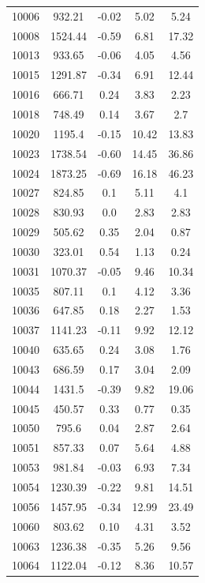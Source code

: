 {\begin{longtable}{ccccc}
10006 & 932.21 & -0.02 & 5.02 & 5.24 \\
10008 & 1524.44 & -0.59 & 6.81 & 17.32 \\
10013 & 933.65 & -0.06 & 4.05 & 4.56 \\
10015 & 1291.87 & -0.34 & 6.91 & 12.44 \\
10016 & 666.71 & 0.24 & 3.83 & 2.23 \\
10018 & 748.49 & 0.14 & 3.67 & 2.7 \\
10020 & 1195.4 & -0.15 & 10.42 & 13.83 \\
10023 & 1738.54 & -0.60 & 14.45 & 36.86 \\
10024 & 1873.25 & -0.69 & 16.18 & 46.23 \\
10027 & 824.85 & 0.1 & 5.11 & 4.1 \\
10028 & 830.93 & 0.0 & 2.83 & 2.83 \\
10029 & 505.62 & 0.35 & 2.04 & 0.87 \\
10030 & 323.01 & 0.54 & 1.13 & 0.24 \\
10031 & 1070.37 & -0.05 & 9.46 & 10.34 \\
10035 & 807.11 & 0.1 & 4.12 & 3.36 \\
10036 & 647.85 & 0.18 & 2.27 & 1.53 \\
10037 & 1141.23 & -0.11 & 9.92 & 12.12 \\
10040 & 635.65 & 0.24 & 3.08 & 1.76 \\
10043 & 686.59 & 0.17 & 3.04 & 2.09 \\
10044 & 1431.5 & -0.39 & 9.82 & 19.06 \\
10045 & 450.57 & 0.33 & 0.77 & 0.35 \\
10050 & 795.6 & 0.04 & 2.87 & 2.64 \\
10051 & 857.33 & 0.07 & 5.64 & 4.88 \\
10053 & 981.84 & -0.03 & 6.93 & 7.34 \\
10054 & 1230.39 & -0.22 & 9.81 & 14.51 \\
10056 & 1457.95 & -0.34 & 12.99 & 23.49 \\
10060 & 803.62 & 0.10 & 4.31 & 3.52 \\
10063 & 1236.38 & -0.35 & 5.26 & 9.56 \\
10064 & 1122.04 & -0.12 & 8.36 & 10.57 \\ \hline
\end{longtable}
}

